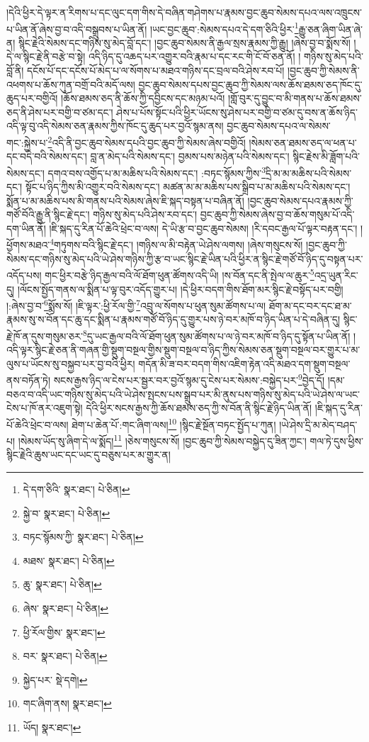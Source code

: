 །དེའི་ཕྱིར་དེ་ལྟར་ན་རིགས་པ་དང་ལུང་དག་གིས་དེ་བཞིན་གཤེགས་པ་རྣམས་བྱང་ཆུབ་སེམས་དཔའ་ལས་འཁྲུངས་པ་ཡིན་ནོ་ཞེས་བྱ་བ་འདི་བསྒྲུབས་པ་ཡིན་ནོ། །ཡང་བྱང་ཆུབ་:སེམས་དཔའ་དེ་དག་ཅིའི་ཕྱིར་\footnote{དེ་དག་ཅིའི་  སྣར་ཐང་།  པེ་ཅིན། }རྒྱུ་ཅན་ཞིག་ཡིན་ཞེ་ན། སྙིང་རྗེའི་སེམས་དང་གཉིས་སུ་མེད་བློ་དང་། །བྱང་ཆུབ་སེམས་ནི་རྒྱལ་སྲས་རྣམས་ཀྱི་རྒྱུ། །ཞེས་བྱ་བ་སྨོས་སོ། །དེ་ལ་སྙིང་རྗེ་ནི་བརྩེ་བ་སྟེ། འདི་ཉིད་དུ་འཆད་པར་འགྱུར་བའི་རྣམ་པ་དང་རང་གི་ངོ་བོ་ཅན་ནོ། །
གཉིས་སུ་མེད་པའི་བློ་ནི། དངོས་པོ་དང་དངོས་པོ་མེད་པ་ལ་སོགས་པ་མཐའ་གཉིས་དང་བྲལ་བའི་ཤེས་རབ་པོ། །བྱང་ཆུབ་ཀྱི་སེམས་ནི་འཕགས་པ་ཆོས་ཀུན་བགྲོ་བའི་མདོ་ལས། བྱང་ཆུབ་སེམས་དཔས་བྱང་ཆུབ་ཀྱི་སེམས་ལས་ཆོས་ཐམས་ཅད་ཁོང་དུ་ཆུད་པར་བགྱིའོ། །ཆོས་ཐམས་ཅད་ནི་ཆོས་ཀྱི་དབྱིངས་དང་མཉམ་པའོ། །གློ་བུར་དུ་བྱུང་བ་མི་གནས་པ་ཆོས་ཐམས་ཅད་ནི་ཤེས་པར་བགྱི་བ་ཙམ་དང་། ཤེས་པ་པོས་སྟོང་པའི་ཕྱིར་ཡོངས་སུ་ཤེས་པར་བགྱི་བ་ཙམ་དུ་བས་ན་ཆོས་ཉིད་འདི་ལྟ་བུ་འདི་སེམས་ཅན་རྣམས་ཀྱིས་ཁོང་དུ་ཆུད་པར་བྱའོ་སྙམ་ནས། བྱང་ཆུབ་སེམས་དཔའ་ལ་སེམས་གང་:སྐྱེས་པ་\footnote{སྐྱེ་བ་  སྣར་ཐང་།  པེ་ཅིན། }འདི་ནི་བྱང་ཆུབ་སེམས་དཔའི་བྱང་ཆུབ་ཀྱི་སེམས་ཞེས་བགྱིའོ། །སེམས་ཅན་ཐམས་ཅད་ལ་ཕན་པ་དང་བདེ་བའི་སེམས་དང་། བླ་ན་མེད་པའི་སེམས་དང་། བྱམས་པས་མཉེན་པའི་སེམས་དང་། སྙིང་རྗེས་མི་ཟློག་པའི་སེམས་དང་། དགའ་བས་འགྱོད་པ་མ་མཆིས་པའི་སེམས་དང་། :བཏང་སྙོམས་ཀྱིས་\footnote{བཏང་སྙོམས་ཀྱི་  སྣར་ཐང་།  པེ་ཅིན། }དྲི་མ་མ་མཆིས་པའི་སེམས་དང་། སྟོང་པ་ཉིད་ཀྱིས་མི་འགྱུར་བའི་སེམས་དང་། མཚན་མ་མ་མཆིས་པས་སྒྲིབ་པ་མ་མཆིས་པའི་སེམས་དང་། སྨོན་པ་མ་མཆིས་པས་མི་གནས་པའི་སེམས་ཞེས་ཇི་སྐད་བསྟན་པ་བཞིན་ནོ། །བྱང་ཆུབ་སེམས་དཔའ་རྣམས་ཀྱི་གཙོ་བོའི་རྒྱུ་ནི་སྙིང་རྗེ་དང་། གཉིས་སུ་མེད་པའི་ཤེས་རབ་དང་། བྱང་ཆུབ་ཀྱི་སེམས་ཞེས་བྱ་བ་ཆོས་གསུམ་པོ་འདི་དག་ཡིན་ནོ། །ཇི་སྐད་དུ་རིན་པོ་ཆེའི་ཕྲེང་བ་ལས། དེ་ཡི་རྩ་བ་བྱང་ཆུབ་སེམས། །རི་དབང་རྒྱལ་པོ་ལྟར་བརྟན་དང་། །ཕྱོགས་མཐའ་\footnote{མཐས་  སྣར་ཐང་།  པེ་ཅིན། }གཏུགས་བའི་སྙིང་རྗེ་དང་། །གཉིས་ལ་མི་བརྟེན་ཡེ་ཤེས་ལགས། །ཞེས་གསུངས་སོ། །བྱང་ཆུབ་ཀྱི་སེམས་དང་གཉིས་སུ་མེད་པའི་ཡེ་ཤེས་གཉིས་ཀྱི་རྩ་བ་ཡང་སྙིང་རྗེ་ཡིན་པའི་ཕྱིར་ན་སྙིང་རྗེ་གཙོ་བོ་ཉིད་དུ་བསྟན་པར་འདོད་པས། གང་ཕྱིར་བརྩེ་ཉིད་རྒྱལ་བའི་ལོ་ཐོག་ཕུན་ཚོགས་འདི་ཡི། །ས་བོན་དང་ནི་སྤེལ་ལ་ཆུར་\footnote{ཆུ་  སྣར་ཐང་།  པེ་ཅིན། }འདྲ་ཡུན་རིང་དུ། །ལོངས་སྤྱོད་གནས་ལ་སྨིན་པ་ལྟ་བུར་འདོད་གྱུར་པ། །དེ་ཕྱིར་བདག་གིས་ཐོག་མར་སྙིང་རྗེ་བསྟོད་པར་བགྱི། །:ཞེས་བྱ་བ་\footnote{ཞེས་  སྣར་ཐང་།  པེ་ཅིན། }སྨོས་སོ། །ཇི་ལྟར་:ཕྱི་རོལ་གྱི་\footnote{ཕྱི་རོལ་གྱིས་  སྣར་ཐང་། }འབྲུ་ལ་སོགས་པ་ཕུན་སུམ་ཚོགས་པ་ལ། ཐོག་མ་དང་བར་དང་ཐ་མ་རྣམས་སུ་ས་བོན་དང་ཆུ་དང་སྨིན་པ་རྣམས་གཙོ་བོ་ཉིད་དུ་གྱུར་པས་ཉེ་བར་མཁོ་བ་ཉིད་ཡིན་པ་དེ་བཞིན་དུ། སྙིང་རྗེ་ཁོ་ན་དུས་གསུམ་ཅར་\footnote{བར་  སྣར་ཐང་།  པེ་ཅིན། }དུ་ཡང་རྒྱལ་བའི་ལོ་ཐོག་ཕུན་སུམ་ཚོགས་པ་ལ་ཉེ་བར་མཁོ་བ་ཉིད་དུ་སྟོན་པ་ཡིན་ནོ། །འདི་ལྟར་སྙིང་རྗེ་ཅན་ནི་གཞན་གྱི་སྡུག་བསྔལ་གྱིས་སྡུག་བསྔལ་བ་ཉིད་ཀྱིས་སེམས་ཅན་སྡུག་བསྔལ་བར་གྱུར་པ་མ་ལུས་པ་ཡོངས་སུ་བསྐྱབ་པར་བྱ་བའི་ཕྱིར། གདོན་མི་ཟ་བར་བདག་གིས་འཇིག་རྟེན་འདི་མཐའ་དག་སྡུག་བསྔལ་ནས་བཏོན་ཏེ། སངས་རྒྱས་ཉིད་ལ་ངེས་པར་སྦྱར་བར་བྱའོ་སྙམ་དུ་ངེས་པར་སེམས་:བསྐྱེད་པར་\footnote{སྐྱེད་པར་  སྡེ་དགེ། }བྱེད་དོ། །དམ་བཅའ་བ་འདི་ཡང་གཉིས་སུ་མེད་པའི་ཡེ་ཤེས་སྤངས་པས་སྒྲུབ་པར་མི་ནུས་པས་གཉིས་སུ་མེད་པའི་ཡེ་ཤེས་ལ་ཡང་ངེས་པ་ཁོ་ནར་འཇུག་སྟེ། དེའི་ཕྱིར་སངས་རྒྱས་ཀྱི་ཆོས་ཐམས་ཅད་ཀྱི་ས་བོན་ནི་སྙིང་རྗེ་ཉིད་ཡིན་ནོ། །ཇི་སྐད་དུ་རིན་པོ་ཆེའི་ཕྲེང་བ་ལས། ཐེག་པ་ཆེན་པོ་:གང་ཞིག་ལས།\footnote{གང་ཞིག་ནས།  སྣར་ཐང་། } །སྙིང་རྗེ་སྔོན་བཏང་སྤྱོད་པ་ཀུན། །ཡེ་ཤེས་དྲི་མ་མེད་བཤད་པ། །སེམས་ཡོད་སུ་ཞིག་དེ་ལ་སྨོད།\footnote{ཡོད།  སྣར་ཐང་། } །ཅེས་གསུངས་སོ། །བྱང་ཆུབ་ཀྱི་སེམས་བསྐྱེད་དུ་ཟིན་ཀྱང་། གལ་ཏེ་དུས་ཕྱིས་སྙིང་རྗེའི་ཆུས་ཡང་དང་ཡང་དུ་བཅུས་པར་མ་གྱུར་ན། 